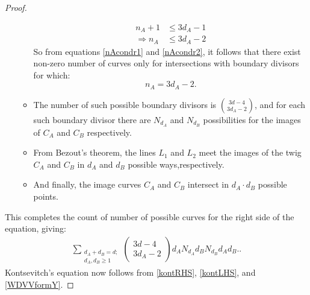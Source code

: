 \begin{proof}
\begin{enumerate}
\begin{itemize}
                    \begin{align}
                        n_{A} + 1 &\leq 3d_{A} -1 \\
                        \Rightarrow n_{A} &\leq 3d_{A} - 2 \label{nAcondr2} 
                    \end{align}
                    So from equations \ref{nAcondr1} and \ref{nAcondr2}, it follows that there exist non-zero number of curves only for intersections with boundary divisors for which:
                    \begin{equation*}
                        n_{A} = 3d_{A} - 2.
                    \end{equation*}
                \item The number of such possible boundary divisors is $\binom{3d-4}{3d_{A}-2}$, and for each such boundary divisor there are $N_{d_{A}}$ and $N_{d_{B}}$ possibilities for the images of $C_{A}$ and $C_{B}$ respectively.
                \item From Bezout's theorem, the lines $L_{1}$ and $L_{2}$ meet the images of the twig $C_{A}$ and $C_{B}$ in $d_{A}$ and $d_{B}$ possible ways,respectively.
                \item And finally, the image curves $C_{A}$ and $C_{B}$ intersect in $d_{A}\cdot d_{B}$ possible points.
            \end{itemize}
    \end{enumerate}
    This completes the count of number of possible curves for the right side of the equation, giving:
    \begin{align}
        \sum_{\substack{d_{A}+d_{B} = d;\\ d_{A},d_{B} \geq 1}}
        \begin{pmatrix}
        3d-4\\
        3d_{A} - 2
        \end{pmatrix} d_{A} N_{d_{A}}  d_{B} N_{d_{B}}  d_{A} d_{B}.\label{kontRHS}.
    \end{align} 
    Kontsevitch's equation now follows from \ref{kontRHS}, \ref{kontLHS}, and \ref{WDVVformY}.
\end{proof}
